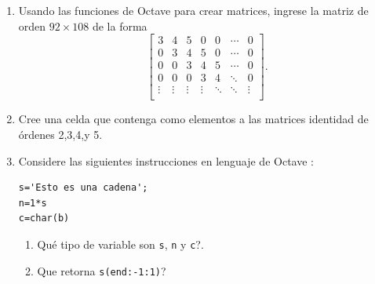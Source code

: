 \documentclass[letter,11pt]{article}
\newcommand\0{\mathbf{0}}
\newcommand{\octave}{{\sc Octave }}
\begin{document}
\begin{enumerate}
$$
A=\begin{bmatrix}
1 & 2 & 3\\
4 & 2 & 5\\
1 & 0 & 1
\end{bmatrix}
\quad 
B=
\frac{1}{2}
\begin{bmatrix}
-2 & 2  & -4\\
-1 & 2  & -7\\
2  & -2 & 6
\end{bmatrix}
$$
\begin{enumerate}
	\item Ingrese a \octave las matrices \texttt{A} y \texttt{B}.
    \item Calcule en \octave los productos matriciales $AB$ y $BA$.
    \item \textquestiondown Qu\'e observa de los resultados anteriores?
    \item Calcule las normas 1, 2 e infinito de $A$  Y $B$.
\end{enumerate}

\item Usando las funciones de \octave para crear matrices, ingrese la matriz de orden $92\times 108$ de la forma
$$
\begin{bmatrix}
3 & 4 & 5 & 0 & 0 & \cdots & 0 \\
0 & 3 & 4 & 5 & 0 & \cdots & 0 \\
0 & 0 & 3 & 4 & 5 & \cdots & 0 \\
0 & 0 & 0 & 3 & 4 & \ddots & 0 \\
\vdots & \vdots & \vdots & \vdots & \ddots & \ddots & \vdots \\
\end{bmatrix}.
$$

\item Cree una celda que contenga como elementos a las matrices identidad de \'ordenes 2,3,4,y 5.

\item Considere las siguientes instrucciones en lenguaje de \octave:
\begin{lstlisting}
s='Esto es una cadena';
n=1*s
c=char(b)
\end{lstlisting}
\begin{enumerate}
\item \textquestiondown Qu\'e tipo de variable son \texttt{s}, \texttt{n} y \texttt{c}?.
\item \textquestiondown Que retorna \texttt{s(end:-1:1)}?
\end{enumerate}


\end{enumerate}
\end{document}
